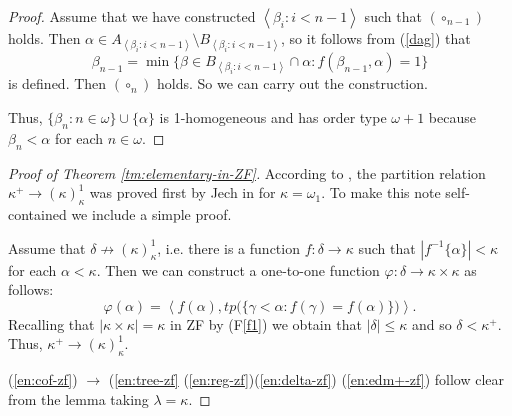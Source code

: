 \documentclass[a4paper,10pt,reqno]{amsart}
\numberwithin{equation}{section}
\theoremstyle{definition}
\theoremstyle{remark}
\newcommand{\setm}{\setminus}
\def\<{\left\langle}
\def\>{\right\rangle}
\begin{document}
\begin{proof}
Assume that we have constructed  $\<{\beta}_i:i<n-1\>$
such that $(\circ_{n-1})$ holds.  Then  ${\alpha}\in A_{\<{\beta}_i:i<n-1\>}\setm 
B_{\<{\beta}_i:i<n-1\>}$, so it follows from (\ref{dag}) that 
\begin{displaymath}
{\beta}_{n-1}=\min\{{\beta}\in  B_{\<{\beta}_i:i<n-1\>}\cap {\alpha}:f({\beta}_{n-1},{\alpha})=1\}
\end{displaymath}
is defined. Then $(\circ_n)$ holds.
So we can carry out the construction. 

Thus, $\{{\beta}_n:n\in {\omega}\}\cup\{{\alpha}\}$ is 1-homogeneous and has order type 
${\omega}+1$ because ${\beta}_n<{\alpha}$ for each $n\in {\omega}$.
\end{proof}

    
\begin{proof}[Proof of Theorem \ref{tm:elementary-in-ZF}]
  
    According to \cite[Section 30 Problem 27]{KoTo06},  
    the partition relation $ {\kappa}^+\to ({\kappa})^1_{\kappa}$ was proved first by Jech 
    in \cite{Je82} for 
    ${\kappa}={\omega}_1$. To make this note self-contained we include a simple proof.  
    
    Assume that ${\delta}\not\to ({\kappa})^1_{\kappa}$, i.e. 
    there is a function  $f:{\delta}\to {\kappa}$  such that 
    $|f^{-1}\{{\alpha}\}|<{\kappa}$ for each ${\alpha}<{\kappa}$.
    Then  we can construct a one-to-one function  
    ${\varphi}:{\delta}\to {\kappa}\times {\kappa}$ as follows: 
        $$
        {\varphi}({\alpha})=\<f({\alpha}),tp\big(\big\{{\gamma}<{\alpha}:f({\gamma})=f({\alpha})\big\}\big)\>.
        $$
    Recalling that $|{\kappa}\times {\kappa}|={\kappa}$ in ZF 
    by (F\ref{f1}) we obtain that $|{\delta}|\le {\kappa}$ and so ${\delta}<{\kappa}^+$.
    Thus, ${\kappa}^+\to ({\kappa})^1_{\kappa}$.
    


    (\ref{en:cof-zf}) $\to $ (\ref{en:tree-zf}  (\ref{en:reg-zf})(\ref{en:delta-zf}) 
    (\ref{en:edm+-zf}) follow clear from the lemma taking ${\lambda}={\kappa}$.
        \end{proof}
    
    
    
\end{document}
